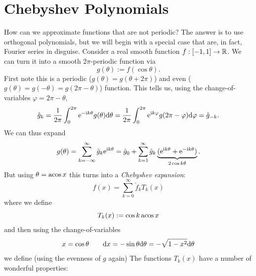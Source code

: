 
\section{Chebyshev Polynomials}
How can we approximate functions that are not periodic? The answer is to use orthogonal polynomials, but we will begin with a special case that are, in fact, Fourier series in disguise. Consider a real smooth function $f : [-1,1] \rightarrow {\mathbb R}$. We can turn it into a smooth 2\ensuremath{\pi}-periodic function via
\[
g(\ensuremath{\theta}) := f(\cos \ensuremath{\theta}).
\]
First note this is a periodic ($g(\ensuremath{\theta}) = g(\ensuremath{\theta}+2\ensuremath{\pi})$) and even ($g(\ensuremath{\theta}) = g(-\ensuremath{\theta})= g(2\ensuremath{\pi}-\ensuremath{\theta})$) function.  This tells us, using the change-of-variables $\ensuremath{\varphi} = 2\ensuremath{\pi}-\ensuremath{\theta}$,
\[
\hat{g}_k = {1 \over 2\pi} \int_0^{2\pi} {\rm e}^{-{\rm i} k \theta} g(\theta) {\rm d} \theta = {1 \over 2\pi} \int_0^{2\pi} {\rm e}^{{\rm i} k \varphi} g(2\pi-\varphi) {\rm d} \varphi = \hat{g}_{-k}.
\]
We can thus expand
\[
g(\theta) = \sum_{k=-\infty}^\infty \hat{g}_k {\rm e}^{{\rm i} k \theta} = \hat{g}_0 + \sum_{k=1}^\infty \hat{g}_k \underbrace{({\rm e}^{{\rm i} k \theta} + {\rm e}^{-{\rm i} k \theta})}_{2 \cos k \theta}.
\]
But using $\theta = {\rm acos}\, x$ this turns into a \emph{Chebyshev expansion}:
\[
f(x) = \ensuremath{\sum}_{k=0}^\ensuremath{\infty} \check{f}_k T_k(x)
\]
where we define
\[
T_k(x) := \cos k\, {\rm acos}\, x
\]
and then using the change-of-variables
\[
x = \cos \theta\qquad {\rm d} x =  -\sin \theta {\rm d} \theta = - \sqrt{1-x^2} {\rm d} \theta
\]
we define (using the evenness of $g$ again)
The functions $T_k(x)$ have a number of wonderful properties:

